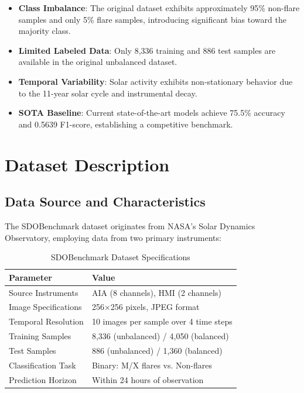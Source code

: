 \documentclass[11pt,a4paper]{article}
\begin{document}
\begin{itemize}
    \item \textbf{Class Imbalance}: The original dataset exhibits approximately 95\% non-flare samples and only 5\% flare samples, introducing significant bias toward the majority class.
    \item \textbf{Limited Labeled Data}: Only 8,336 training and 886 test samples are available in the original unbalanced dataset.
    \item \textbf{Temporal Variability}: Solar activity exhibits non-stationary behavior due to the 11-year solar cycle and instrumental decay.
    \item \textbf{SOTA Baseline}: Current state-of-the-art models achieve 75.5\% accuracy and 0.5639 F1-score, establishing a competitive benchmark.
\end{itemize}

\section{Dataset Description}

\subsection{Data Source and Characteristics}

The SDOBenchmark dataset originates from NASA's Solar Dynamics Observatory, employing data from two primary instruments:

\begin{table}[H]
\centering
\begin{tabular}{|l|l|}
\hline
\textbf{Parameter} & \textbf{Value} \\
\hline
Source Instruments & AIA (8 channels), HMI (2 channels) \\
Image Specifications & 256×256 pixels, JPEG format \\
Temporal Resolution & 10 images per sample over 4 time steps \\
Training Samples & 8,336 (unbalanced) / 4,050 (balanced) \\
Test Samples & 886 (unbalanced) / 1,360 (balanced) \\
Classification Task & Binary: M/X flares vs. Non-flares \\
Prediction Horizon & Within 24 hours of observation \\
\hline
\end{tabular}
\caption{SDOBenchmark Dataset Specifications}
\end{table}
\end{document}
